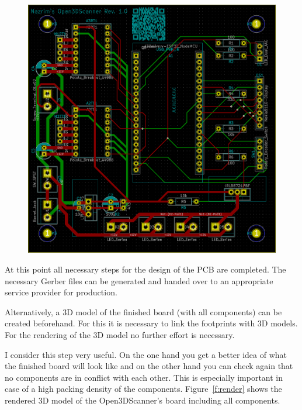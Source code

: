 \begin{figure}[ht!]%
		\includegraphics[width=\linewidth]{images/PCB.png}%
\end{figure}%

At this point all necessary steps for the design of the PCB are completed. The necessary Gerber files can be generated and handed over to an appropriate service provider for production.%

Alternatively, a 3D model of the finished board (with all components) can be created beforehand. For this it is necessary to link the footprints with 3D models. For the rendering of the 3D model no further effort is necessary.%

I consider this step very useful. On the one hand you get a better idea of what the finished board will look like and on the other hand you can check again that no components are in conflict with each other. This is especially important in case of a high packing density of the components. Figure~\ref{f:render} shows the rendered 3D model of the Open3DScanner's board including all components.%


